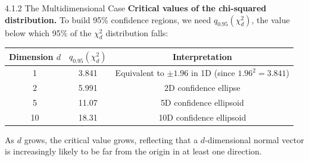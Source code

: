 \documentclass[aspectratio=169,10pt]{beamer}
\begin{document}
\begin{frame}[allowframebreaks]{4.1.2 The Multidimensional Case}
\textbf{Critical values of the chi-squared distribution.}
To build 95\% confidence regions, we need $q_{0.95}(\chi_d^2)$, the
value below which 95\% of the $\chi_d^2$ distribution falls:
\begin{center}
  \begin{tabular}{ccc}
    \toprule
    Dimension $d$ & $q_{0.95}(\chi_d^2)$ & Interpretation \\
    \midrule
    1   & 3.841 & Equivalent to $\pm 1.96$ in 1D (since $1.96^2 = 3.841$) \\
    2   & 5.991 & 2D confidence ellipse \\
    5   & 11.07 & 5D confidence ellipsoid \\
    10  & 18.31 & 10D confidence ellipsoid \\
    \bottomrule
  \end{tabular}
\end{center}
As $d$ grows, the critical value grows, reflecting that a $d$-dimensional
normal vector is increasingly likely to be far from the origin in at
least one direction.

\end{frame}
\end{document}
